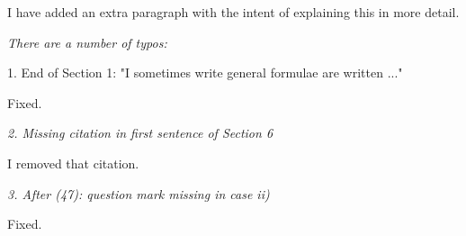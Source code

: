\documentclass[a4paper, 12pt]{article}
\renewcommand{\quote}{\em \color{orange}}
\begin{document}
I have added an extra paragraph with the intent of explaining this in more
detail.


{\quote
There are a number of typos:

1. End of Section 1: "I sometimes write general formulae are written ..."}

Fixed.

{\quote
2. Missing citation in first sentence of Section 6}

I removed that citation.

{\quote
3. After (47): question mark missing in case ii)}

Fixed.





\end{document}
